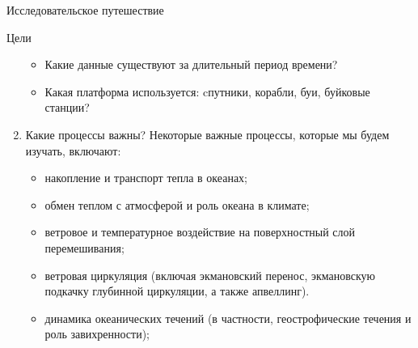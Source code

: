 \begin{chapter}{Исследовательское путешествие}
\begin{section}{Цели}
\begin{enumerate}
\begin{itemize}
  \item
  Какие данные существуют за длительный период времени? 
%

  \item
  Какая платформа используется: cпутники, корабли, буи, буйковые станции?
%
\end{itemize}

\item
Какие процессы важны? Некоторые важные процессы, которые мы будем изучать, 
включают:
%
\begin{itemize}
  \item
  накопление и транспорт тепла в океанах;
%

  \item
  обмен теплом с атмосферой и роль океана в климате; 
%

  \item
  ветровое и температурное воздействие на поверхностный слой перемешивания; 
%

  \item
  ветровая циркуляция (включая экмановский перенос, экмановскую подкачку
  глубинной циркуляции, а также апвеллинг). 
%

  \item
  динамика океанических течений (в частности, геострофические течения и роль 
  завихренности); 
%


\end{itemize}
\end{enumerate}
\end{section}
\end{chapter}
